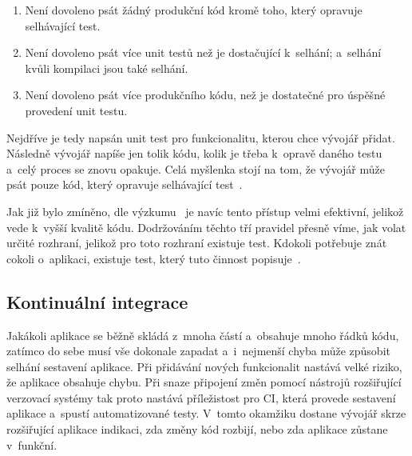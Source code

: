 \begin{enumerate}
    \item Není dovoleno psát žádný produkční kód kromě toho,
    který opravuje selhávající test.
    \item Není dovoleno psát více unit testů než je dostačující k~selhání;
    a~selhání kvůli kompilaci jsou také selhání.
    \item Není dovoleno psát více produkčního kódu,
    než je dostatečné pro úspěšné provedení unit testu.
\end{enumerate}

\pagebreak
Nejdříve je tedy napsán unit test pro funkcionalitu,
kterou chce vývojář přidat.
Následně vývojář napíše jen tolik kódu,
kolik je třeba k~opravě daného testu a~celý proces se znovu opakuje.
Celá myšlenka stojí na tom,
že vývojář může psát pouze kód,
který opravuje selhávající test~\cite{tdd}.
\emph{}~\cite{tdd}
 
Jak již bylo zmíněno,
dle výzkumu~\cite{testing_quality} je navíc tento přístup velmi efektivní,
jelikož vede k~vyšší kvalitě kódu.
Dodržováním těchto tří pravidel přesně víme,
jak volat určité rozhraní,
jelikož pro toto rozhraní existuje test.
Kdokoli potřebuje znát cokoli o~aplikaci,
existuje test,
který tuto činnost popisuje~\cite{tdd}.

\subsection{Kontinuální integrace}
\label{chap:ci}

Jakákoli aplikace se běžně skládá z~mnoha částí
a~obsahuje mnoho řádků kódu,
zatímco do sebe musí vše dokonale zapadat
a~i~nejmenší chyba může způsobit selhání sestavení aplikace.
Při přidávání nových funkcionalit nastává velké riziko,
že aplikace obsahuje chybu.
Při snaze připojení změn pomocí nástrojů rozšiřující verzovací systémy
tak proto nastává příležistost pro CI,
která provede sestavení aplikace a~spustí automatizované testy.
V~tomto okamžiku dostane vývojář skrze rozšiřující aplikace indikaci,
zda změny kód rozbijí,
nebo zda aplikace zůstane v~funkční.~\cite{ci}

